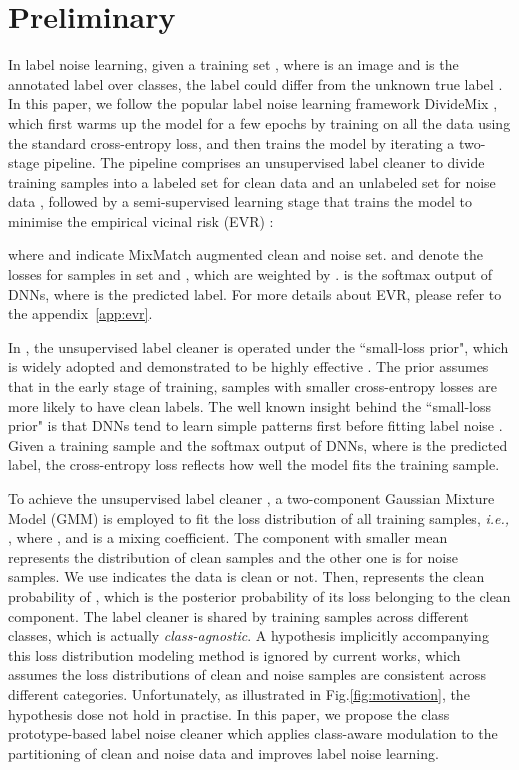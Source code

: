 \documentclass{article} \usepackage{iclr2023_conference,times}
\begin{document}
\section{Preliminary}\label{sec:preliminary}
In label noise learning, given a training set , where  is an image and  is the annotated label over  classes,  the label  could differ from the unknown true label . 
In this paper, we follow the popular label noise learning framework DivideMix \citep{Li2020DivideMixLW}, which first warms up the model for a few epochs by training on all the data using the standard cross-entropy loss, and then trains the model by iterating a two-stage   pipeline. The pipeline comprises an unsupervised label cleaner  to divide training samples into a labeled set for clean data  and an unlabeled set for noise data , followed by a semi-supervised learning stage that trains the model to minimise the empirical vicinal risk (EVR) \citep{zhang2017mixup}:

where  and  indicate MixMatch \citep{berthelot2019mixmatch} augmented clean and noise set.   and  denote the losses for samples in set  and , which are weighted by .   is the softmax output of DNNs, where  is the predicted label. For more details about EVR, please refer to the appendix~\ref{app:evr}. 

In \citet{Li2020DivideMixLW}, the unsupervised label cleaner is operated under the ``small-loss prior", which is widely adopted and demonstrated to be highly effective \citep{han2020survey}.
 The prior assumes that in the early stage of training, samples with smaller cross-entropy losses are more likely to have clean labels. The well known insight behind the ``small-loss prior" is that DNNs tend to learn simple patterns first before fitting label noise \citep{arpit2017closer}. Given a training sample  and the softmax output  of DNNs, where  is the predicted label, the cross-entropy loss  reflects how well the model fits the training sample. 

To achieve the unsupervised label cleaner , a two-component Gaussian Mixture Model (GMM) is employed to fit the loss distribution of all training samples, \emph{i.e.,} , where , and  is a mixing coefficient.
The component with smaller mean represents the distribution of clean samples and the other one is for noise samples.
We use  indicates the data is clean or not. Then,  represents the clean probability of , which is the posterior probability of its loss belonging to the clean component.  The label cleaner is shared by training samples across different classes, which is actually \textit{class-agnostic}.
A hypothesis implicitly accompanying this loss distribution modeling method is ignored by current works, which assumes the loss distributions of clean and noise samples are consistent across different categories.
Unfortunately, as illustrated in Fig.\ref{fig:motivation}, the  hypothesis dose not hold in practise. In this paper, we propose the class prototype-based label noise cleaner which applies class-aware modulation to the partitioning of clean and noise data and improves label noise learning.
\end{document}
